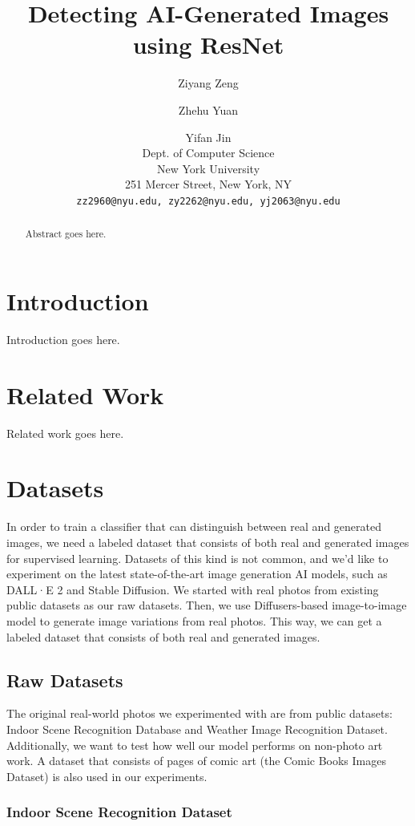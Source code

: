 \documentclass[11pt]{article}
\title{Detecting AI-Generated Images using ResNet}
\author{Ziyang Zeng \and Zhehu Yuan \and Yifan Jin \\
  Dept. of Computer Science \\
  New York University \\
  251 Mercer Street, New York, NY \\
  \texttt{zz2960@nyu.edu, zy2262@nyu.edu, yj2063@nyu.edu}}
\begin{document}
\maketitle
\begin{abstract}
  Abstract goes here.
\end{abstract}

\section{Introduction}

Introduction goes here.


\section{Related Work}

Related work goes here.

\section{Datasets}

In order to train a classifier that can distinguish between real and generated images, we need a labeled dataset that consists  of both real and generated images for supervised learning. Datasets of this kind is not common, and we'd like to experiment on the latest state-of-the-art image generation AI models, such as DALL·E 2 and Stable Diffusion. We started with real photos from existing public datasets as our raw datasets. Then, we use Diffusers-based image-to-image model to generate image variations from real photos. This way, we can get a labeled dataset that consists of both real and generated images.

\subsection{Raw Datasets}
\label{sec:raw_datasets}

The original real-world photos we experimented with are from public datasets: Indoor Scene Recognition Database and Weather Image Recognition Dataset. Additionally, we want to test how well our model performs on non-photo art work. A dataset that consists of pages of comic art (the Comic Books Images Dataset) is also used in our experiments.

\subsubsection{Indoor Scene Recognition Dataset}
\end{document}
